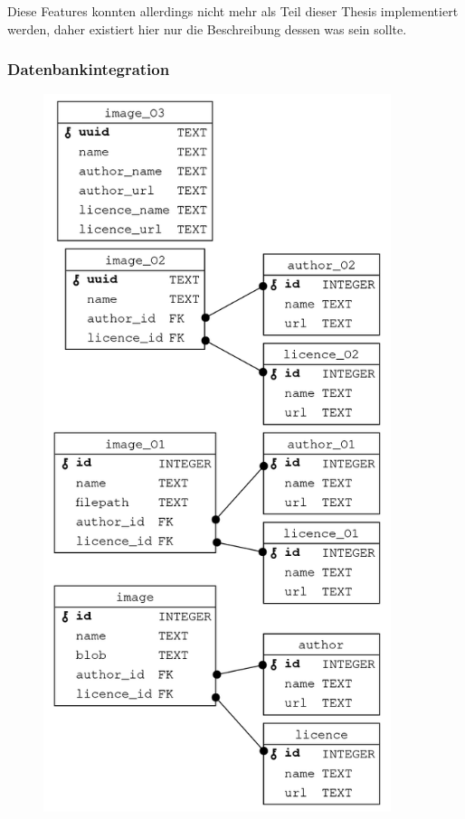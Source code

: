 Diese Features konnten allerdings nicht mehr als Teil dieser Thesis
implementiert werden, daher existiert hier nur die Beschreibung dessen was sein
sollte.

\cleardoublepage
\subsubsection{Datenbankintegration}
\label{subse:4-database-integration}

\begin{figure}
  \centering
  \includegraphics[height=21cm]{images/image_database_schemas.png}
\end{figure}

